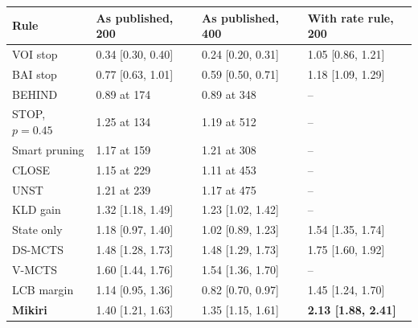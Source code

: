 \begin{tabular}{llll}
\toprule
Rule & As published, 200 & As published, 400 & With rate rule, 200 \\
\midrule
VOI stop \cite{hay2012selecting} & 0.34 [0.30, 0.40] & 0.24 [0.20, 0.31] & 1.05 [0.86, 1.21] \\
BAI stop \cite{kaufmann2017monte} & 0.77 [0.63, 1.01] & 0.59 [0.50, 0.71] & 1.18 [1.09, 1.29] \\
BEHIND \cite{huang2010time} & 0.89 at 174 & 0.89 at 348 & -- \\
STOP, $p=0.45$ \cite{baier2016time} & 1.25 at 134 & 1.19 at 512 & -- \\
Smart pruning \cite{lc0_options} & 1.17 at 159 & 1.21 at 308 & -- \\
CLOSE \cite{baier2016time} & 1.15 at 229 & 1.11 at 453 & -- \\
UNST \cite{huang2010time} & 1.21 at 239 & 1.17 at 475 & -- \\
KLD gain \cite{lc0_options} & 1.32 [1.18, 1.49] & 1.23 [1.02, 1.42] & -- \\
State only \cite{muppidi2026finding} & 1.18 [0.97, 1.40] & 1.02 [0.89, 1.23] & 1.54 [1.35, 1.74] \\
DS-MCTS \cite{lan2021learning} & 1.48 [1.28, 1.73] & 1.48 [1.29, 1.73] & 1.75 [1.60, 1.92] \\
V-MCTS \cite{ye2022spending} & 1.60 [1.44, 1.76] & 1.54 [1.36, 1.70] & -- \\
LCB margin & 1.14 [0.95, 1.36] & 0.82 [0.70, 0.97] & 1.45 [1.24, 1.70] \\
\textbf{Mikiri} & 1.40 [1.21, 1.63] & 1.35 [1.15, 1.61] & \textbf{2.13 [1.88, 2.41]} \\
\bottomrule
\end{tabular}
